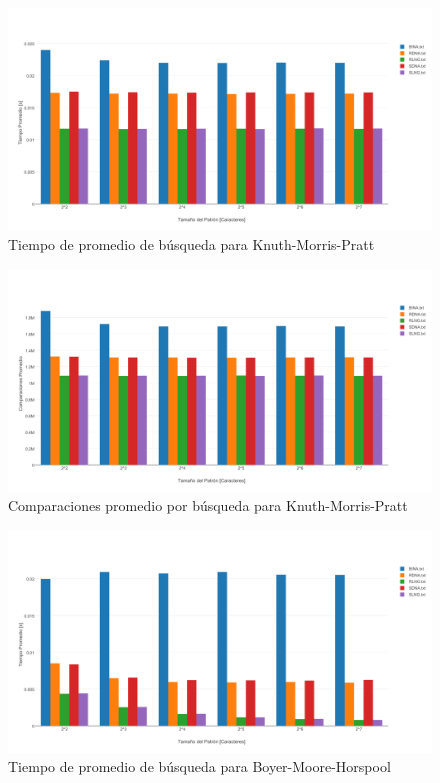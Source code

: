 \documentclass[14pt,letterpaper,hidelinks]{extarticle}
\begin{document}
\newpage

		\begin{figure}[ht!]
			\centering
			\includegraphics[scale=0.5]{img/tKMP.pdf}
			\caption{Tiempo de promedio de búsqueda para Knuth-Morris-Pratt} \label{construccion}
		\end{figure}

	\newpage
		\begin{figure}[ht!]
			\centering
			\includegraphics[scale=0.5]{img/cKMP.pdf}
			\caption{Comparaciones promedio por búsqueda para Knuth-Morris-Pratt} \label{construccion}
		\end{figure}

\newpage
		\begin{figure}[ht!]
			\centering
			\includegraphics[scale=0.5]{img/tBMH.pdf}
			\caption{Tiempo de promedio de búsqueda para Boyer-Moore-Horspool} \label{construccion}
		\end{figure}
\end{document}
